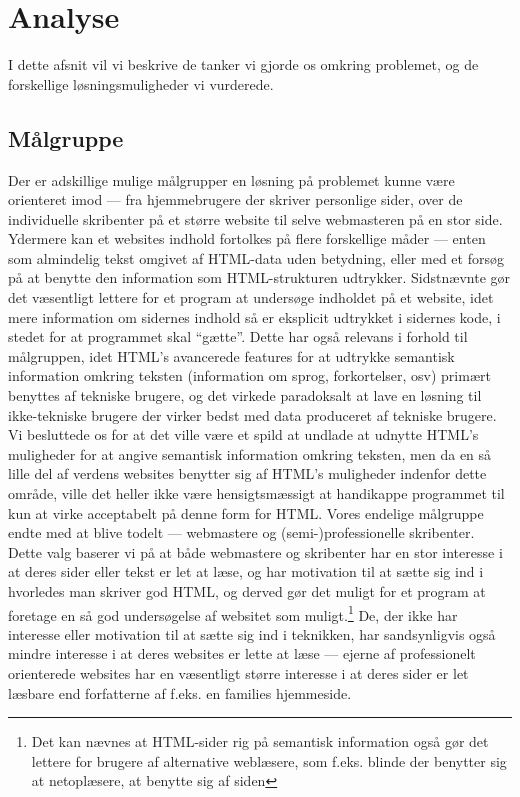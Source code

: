 \documentclass[a4paper,oneside,article]{memoir}
\begin{document}
\chapter{Analyse}

I dette afsnit vil vi beskrive de tanker vi gjorde os omkring
problemet, og de forskellige løsningsmuligheder vi vurderede.

\section{Målgruppe}
\label{målgruppe}
Der er adskillige mulige målgrupper en løsning på problemet kunne være
orienteret imod --- fra hjemmebrugere der skriver personlige sider,
over de individuelle skribenter på et større website til selve
webmasteren på en stor side. Ydermere kan et websites indhold
fortolkes på flere forskellige måder --- enten som almindelig tekst
omgivet af HTML-data uden betydning, eller med et forsøg på at benytte
den information som HTML-strukturen udtrykker. Sidstnævnte gør det
væsentligt lettere for et program at undersøge indholdet på et
website, idet mere information om sidernes indhold så er eksplicit
udtrykket i sidernes kode, i stedet for at programmet skal
``gætte''. Dette har også relevans i forhold til målgruppen, idet
HTML's avancerede features for at udtrykke semantisk information
omkring teksten (information om sprog, forkortelser, osv) primært
benyttes af tekniske brugere, og det virkede paradoksalt at lave en
løsning til ikke-tekniske brugere der virker bedst med data produceret
af tekniske brugere. Vi besluttede os for at det ville være et spild
at undlade at udnytte HTML's muligheder for at angive semantisk
information omkring teksten, men da en så lille del af verdens
websites benytter sig af HTML's muligheder indenfor dette område,
ville det heller ikke være hensigtsmæssigt at handikappe programmet
til kun at virke acceptabelt på denne form for HTML. Vores endelige
målgruppe endte med at blive todelt --- webmastere og
(semi-)professionelle skribenter. Dette valg baserer vi på at både
webmastere og skribenter har en stor interesse i at deres sider eller
tekst er let at læse, og har motivation til at sætte sig ind i
hvorledes man skriver god HTML, og derved gør det muligt for et
program at foretage en så god undersøgelse af websitet som
muligt.\footnote{Det kan nævnes at HTML-sider rig på semantisk
  information også gør det lettere for brugere af alternative
  weblæsere, som f.eks. blinde der benytter sig at netoplæsere, at
  benytte sig af siden} De, der ikke har interesse eller motivation
til at sætte sig ind i teknikken, har sandsynligvis også mindre
interesse i at deres websites er lette at læse --- ejerne af
professionelt orienterede websites har en væsentligt større interesse
i at deres sider er let læsbare end forfatterne af f.eks. en families
hjemmeside.
\end{document}
